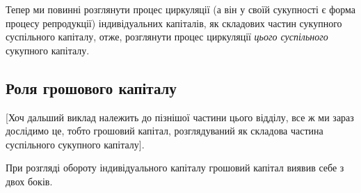 Тепер ми повинні розглянути процес циркуляції (а він у своїй сукупності
є форма процесу репродукції) індивідуальних капіталів, як складових
частин сукупного суспільного капіталу, отже, розглянути процес
циркуляції \emph{цього суспільного} сукупного капіталу.

\subsection{Роля грошового капіталу}

[Хоч дальший виклад належить до пізнішої частини цього відділу,
все ж ми зараз дослідимо це, тобто грошовий капітал, розглядуваний
як складова частина суспільного сукупного капіталу].

При розгляді обороту індивідуального капіталу грошовий капітал виявив
себе з двох боків.
